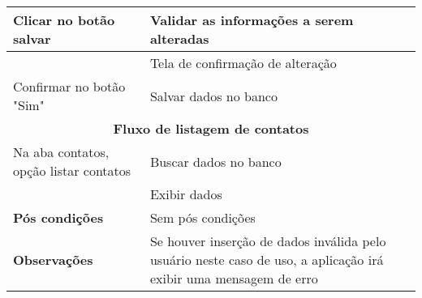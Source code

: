 \begin{center}
\begin{tabular}{ |p{7cm}|p{7cm}| }
 \hline
 Clicar no botão salvar & Validar as informações a serem alteradas\\
 \hline
  & Tela de confirmação de alteração \\
 \hline
 Confirmar no botão "Sim" & Salvar dados no banco \\
 \hline
 \multicolumn{2}{|c|}{\textbf{Fluxo de listagem de contatos} } \\
 \hline 
 Na aba contatos, opção listar contatos & Buscar dados no banco \\
 \hline
 & Exibir dados\\
 \hline
 \textbf{Pós condições} & Sem pós condições \\
 \hline
 \textbf{Observações} & Se houver inserção de dados inválida pelo usuário neste caso de uso, a aplicação irá exibir uma mensagem de erro\\
 \hline
\end{tabular}
\end{center}